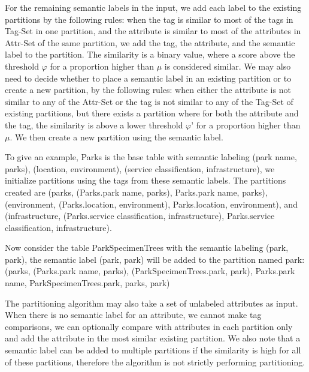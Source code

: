For the remaining semantic labels in the input, we add each label to the existing partitions by the following rules: when the tag is similar to most of the tags in Tag-Set in one partition, and the attribute is similar to most of the attributes in Attr-Set of the same partition, we add the tag, the attribute, and the semantic label to the partition. The similarity is a binary value, where a score above the threshold $\varphi$ for a proportion higher than $\mu$ is considered similar. We may also need to decide whether to place a semantic label in an existing partition or to create a new partition, by the following rules: when either the attribute is not similar to any of the Attr-Set or the tag is not similar to any of the Tag-Set of existing partitions, but there exists a partition where for both the attribute and the tag, the similarity is above a lower threshold $\varphi$' for a proportion higher than $\mu$. We then create a new partition using the semantic label.

To give an example, Parks is the base table with semantic labeling {(park name, parks), (location, environment), (service classification, infrastructure)}, we initialize partitions using the tags from these semantic labels. The partitions created are
(parks, {(Parks.park name, parks)}, {Parks.park name}, {parks}),
(environment, {(Parks.location, environment)}, {Parks.location}, {environment}), and
(infrastructure, {(Parks.service classification, infrastructure)}, {Parks.service classification}, {infrastructure}).

Now consider the table ParkSpecimenTrees with the semantic labeling {(park, park)}, the semantic label (park, park) will be added to the partition named park:
(parks, {(Parks.park name, parks), (ParkSpecimenTrees.park, park)}, {Parks.park name, ParkSpecimenTrees.park}, {parks, park})

The partitioning algorithm may also take a set of unlabeled attributes as input. When there is no semantic label for an attribute, we cannot make tag comparisons, we can optionally compare with attributes in each partition only and add the attribute in the most similar existing partition. We also note that a semantic label can be added to multiple partitions if the similarity is high for all of these partitions, therefore the algorithm is not strictly performing partitioning.
